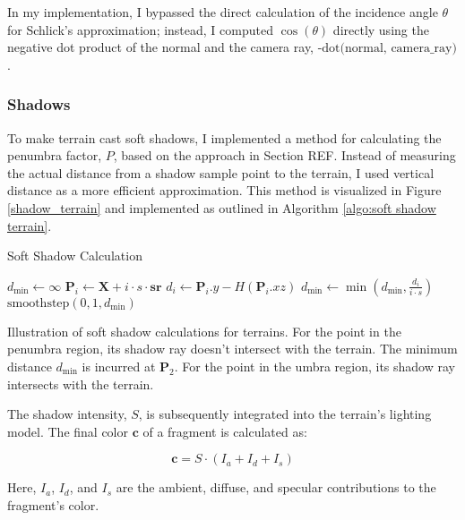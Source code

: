 In my implementation, I bypassed the direct calculation of the incidence angle $\theta$ for Schlick's approximation; instead, I computed $\cos(\theta)$ directly using the negative dot product of the normal and the camera ray, $\text{-dot(normal, camera\_ray)}$.

\subsubsection{Shadows}
\label{Terrain Shadows}

To make terrain cast soft shadows, I implemented a method for calculating the penumbra factor, $P$, based on the approach in Section REF. Instead of measuring the actual distance from a shadow sample point to the terrain, I used vertical distance as a more efficient approximation. This method is visualized in Figure \ref{shadow_terrain} and implemented as outlined in Algorithm \ref{algo:soft shadow terrain}.

\begin{algorithm}
\caption{Soft Shadow Calculation}
\label{algo:soft shadow terrain}
\begin{algorithmic}
    \State $d_{\text{min}} \gets \infty$
        \State $\mathbf{P}_i \gets \mathbf{X} + i \cdot s \cdot \mathbf{sr}$
        \State $d_i \gets \mathbf{P}_i.y - H(\mathbf{P}_i.xz)$
        \State $d_{\text{min}} \gets \min(d_{\text{min}}, \frac{d_i}{i \cdot s})$
    \EndFor
    \State \Return $\text{smoothstep}(0, 1, d_{\text{min}})$
\EndFunction
\end{algorithmic}
\end{algorithm}

{Illustration of soft shadow calculations for terrains. For the point in the penumbra region, its shadow ray doesn't intersect with the terrain. The minimum distance $d_{\text{min}}$ is incurred at $\mathbf{P}_2$. For the point in the umbra region, its shadow ray intersects with the terrain.}

The shadow intensity, $S$, is subsequently integrated into the terrain's lighting model. The final color $\mathbf{c}$ of a fragment is calculated as:

\begin{equation}
    \mathbf{c} = S \cdot (I_{a} + I_{d} + I_{s})
\end{equation}

Here, $I_{a}$, $I_{d}$, and $I_{s}$ are the ambient, diffuse, and specular contributions to the fragment's color.


